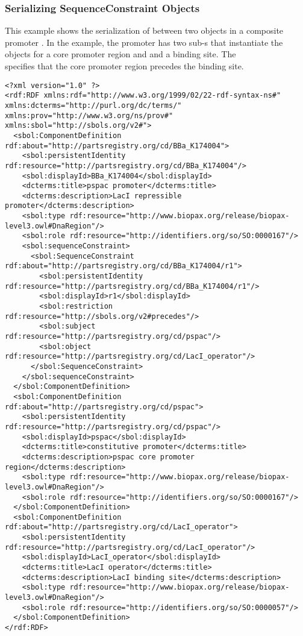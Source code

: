 \subsubsection{Serializing SequenceConstraint Objects}
This example shows the serialization of  between two  objects in a composite promoter . In the example, the promoter  has two sub-s that instantiate the  objects for a core promoter region and and a binding site. The\\
 specifies that the core promoter region precedes the binding site.
\begin{lstlisting}
<?xml version="1.0" ?>
<rdf:RDF xmlns:rdf="http://www.w3.org/1999/02/22-rdf-syntax-ns#" xmlns:dcterms="http://purl.org/dc/terms/" xmlns:prov="http://www.w3.org/ns/prov#" xmlns:sbol="http://sbols.org/v2#">
  <sbol:ComponentDefinition rdf:about="http://partsregistry.org/cd/BBa_K174004">
    <sbol:persistentIdentity rdf:resource="http://partsregistry.org/cd/BBa_K174004"/>
    <sbol:displayId>BBa_K174004</sbol:displayId>
    <dcterms:title>pspac promoter</dcterms:title>
    <dcterms:description>LacI repressible promoter</dcterms:description>
    <sbol:type rdf:resource="http://www.biopax.org/release/biopax-level3.owl#DnaRegion"/>
    <sbol:role rdf:resource="http://identifiers.org/so/SO:0000167"/>
    <sbol:sequenceConstraint>
      <sbol:SequenceConstraint rdf:about="http://partsregistry.org/cd/BBa_K174004/r1">
        <sbol:persistentIdentity rdf:resource="http://partsregistry.org/cd/BBa_K174004/r1"/>
        <sbol:displayId>r1</sbol:displayId>
        <sbol:restriction rdf:resource="http://sbols.org/v2#precedes"/>
        <sbol:subject rdf:resource="http://partsregistry.org/cd/pspac"/>
        <sbol:object rdf:resource="http://partsregistry.org/cd/LacI_operator"/>
      </sbol:SequenceConstraint>
    </sbol:sequenceConstraint>
  </sbol:ComponentDefinition>
  <sbol:ComponentDefinition rdf:about="http://partsregistry.org/cd/pspac">
    <sbol:persistentIdentity rdf:resource="http://partsregistry.org/cd/pspac"/>
    <sbol:displayId>pspac</sbol:displayId>
    <dcterms:title>constitutive promoter</dcterms:title>
    <dcterms:description>pspac core promoter region</dcterms:description>
    <sbol:type rdf:resource="http://www.biopax.org/release/biopax-level3.owl#DnaRegion"/>
    <sbol:role rdf:resource="http://identifiers.org/so/SO:0000167"/>
  </sbol:ComponentDefinition>
  <sbol:ComponentDefinition rdf:about="http://partsregistry.org/cd/LacI_operator">
    <sbol:persistentIdentity rdf:resource="http://partsregistry.org/cd/LacI_operator"/>
    <sbol:displayId>LacI_operator</sbol:displayId>
    <dcterms:title>LacI operator</dcterms:title>
    <dcterms:description>LacI binding site</dcterms:description>
    <sbol:type rdf:resource="http://www.biopax.org/release/biopax-level3.owl#DnaRegion"/>
    <sbol:role rdf:resource="http://identifiers.org/so/SO:0000057"/>
  </sbol:ComponentDefinition>
</rdf:RDF>
\end{lstlisting}

